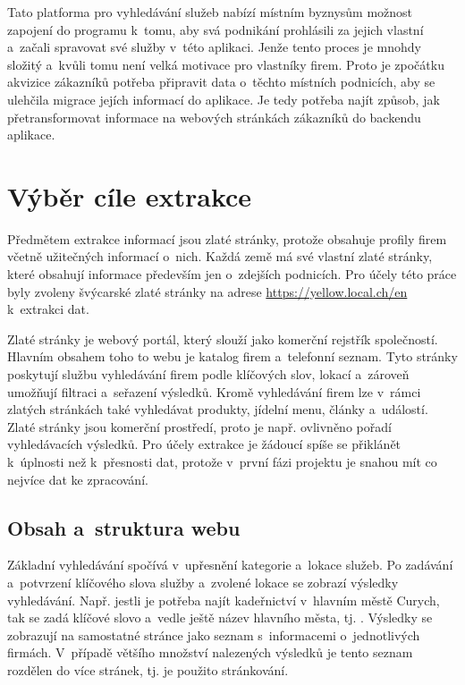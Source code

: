 \documentclass[11pt,a4paper]{article}
\begin{document}
Tato platforma pro vyhledávání služeb nabízí místním byznysům možnost zapojení do programu k~tomu, aby svá podnikání prohlásili za jejich vlastní a~začali spravovat své služby v~této aplikaci. Jenže tento proces je mnohdy složitý a~kvůli tomu není velká motivace pro vlastníky firem. Proto je zpočátku akvizice zákazníků potřeba připravit data o~těchto místních podnicích, aby se ulehčila migrace jejích informací do aplikace. Je tedy potřeba najít způsob, jak přetransformovat informace na webových stránkách zákazníků do backendu aplikace.


\section{Výběr cíle extrakce}
Předmětem extrakce informací jsou zlaté stránky, protože obsahuje profily firem včetně užitečných informací o~nich. Každá země má své vlastní zlaté stránky, které obsahují informace především jen o~zdejších podnicích. Pro účely této práce byly zvoleny švýcarské zlaté stránky na adrese \url{https://yellow.local.ch/en} k~extrakci dat.

Zlaté stránky je webový portál, který slouží jako komerční rejstřík společností. Hlavním obsahem toho to webu je katalog firem a~telefonní seznam. Tyto stránky poskytují službu vyhledávání firem podle klíčových slov, lokací a~zároveň umožňují filtraci a~seřazení výsledků. Kromě vyhledávání firem lze v~rámci zlatých stránkách také vyhledávat produkty, jídelní menu, články a~událostí. Zlaté stránky jsou komerční prostředí, proto je např. ovlivněno pořadí vyhledávacích výsledků. Pro účely extrakce je žádoucí spíše se přiklánět k~úplnosti než k~přesnosti dat, protože v~první fázi projektu je snahou mít co nejvíce dat ke zpracování.

\subsection{Obsah a~struktura webu}
Základní vyhledávání spočívá v~upřesnění kategorie a~lokace služeb. Po zadávání a~potvrzení klíčového slova služby a~zvolené lokace se zobrazí výsledky vyhledávání. Např. jestli je potřeba najít kadeřnictví v~hlavním městě Curych, tak se zadá klíčové slovo  a~vedle ještě název hlavního města, tj. . Výsledky se zobrazují na samostatné stránce jako seznam s~informacemi o~jednotlivých firmách. V~případě většího množství nalezených výsledků je tento seznam rozdělen do více stránek, tj. je použito stránkování.
\end{document}
